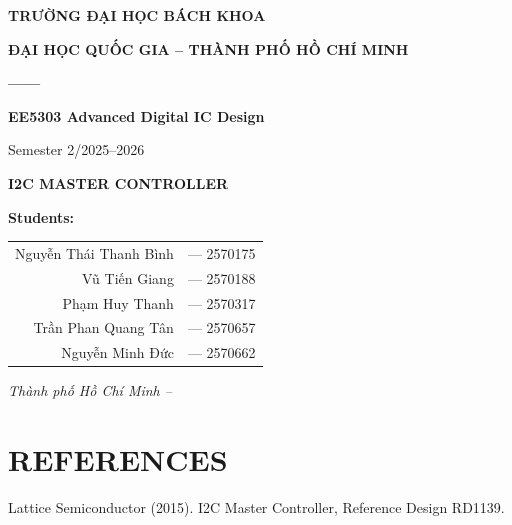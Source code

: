 \documentclass[12pt,a4paper]{article}
\begin{document}
\begin{titlepage}


    \centering
    \vspace*{0.5cm}

    {\fontsize{14}{17}\selectfont \textbf{TRƯỜNG ĐẠI HỌC BÁCH KHOA}}
    \vspace{0.2cm}

    {\fontsize{14}{17}\selectfont \textbf{ĐẠI HỌC QUỐC GIA -- THÀNH PHỐ HỒ CHÍ MINH}}
    \vspace{0.3cm}

    {\color{bkblue} \textbf{------}}
    \vspace{0.8cm}

    {\fontsize{14}{17}\selectfont \textbf{EE5303 Advanced Digital IC Design}}
    \vspace{0.35cm}

    {\fontsize{13}{16}\selectfont Semester 2/2025--2026}
    \vspace{1cm}

    {\fontsize{16}{20}\selectfont \textbf{I2C MASTER CONTROLLER}}
    \vspace{1.2cm}

    {\fontsize{13}{16}\selectfont \textbf{Students:}}
    \vspace{0.5cm}

    \renewcommand{\arraystretch}{1.35}
    \fontsize{12}{14}\selectfont
    \begin{tabular}{r l}
        Nguyễn Thái Thanh Bình & --- 2570175 \\
        Vũ Tiến Giang & --- 2570188 \\
        Phạm Huy Thanh & --- 2570317 \\
        Trần Phan Quang Tân & --- 2570657 \\
        Nguyễn Minh Đức & --- 2570662 \\
    \end{tabular}

    \vfill

    {\fontsize{13}{16}\selectfont \textit{Thành phố Hồ Chí Minh -- \the\year}}

    \vspace{0.5cm}

    \restoregeometry
\end{titlepage}

\newpage
\tableofcontents

\newpage


\newpage
\section*{REFERENCES}

\noindent Lattice Semiconductor (2015). I2C Master Controller, Reference Design RD1139.
\end{document}
